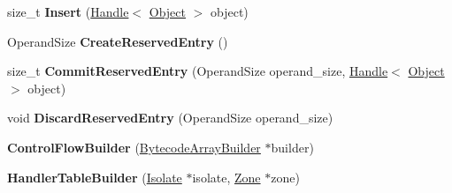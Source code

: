 \begin{DoxyCompactItemize}
\item 
size\+\_\+t {\bfseries Insert} (\hyperlink{classv8_1_1internal_1_1_handle}{Handle}$<$ \hyperlink{classv8_1_1internal_1_1_object}{Object} $>$ object)\hypertarget{classv8_1_1internal_1_1interpreter_1_1_b_a_s_e___e_m_b_e_d_d_e_d_a3e75c4dd219a2caca47c3ab4bd1121ea}{}\label{classv8_1_1internal_1_1interpreter_1_1_b_a_s_e___e_m_b_e_d_d_e_d_a3e75c4dd219a2caca47c3ab4bd1121ea}

\item 
Operand\+Size {\bfseries Create\+Reserved\+Entry} ()\hypertarget{classv8_1_1internal_1_1interpreter_1_1_b_a_s_e___e_m_b_e_d_d_e_d_a2ae73b8d4403040e1e99575c9af0f0ff}{}\label{classv8_1_1internal_1_1interpreter_1_1_b_a_s_e___e_m_b_e_d_d_e_d_a2ae73b8d4403040e1e99575c9af0f0ff}

\item 
size\+\_\+t {\bfseries Commit\+Reserved\+Entry} (Operand\+Size operand\+\_\+size, \hyperlink{classv8_1_1internal_1_1_handle}{Handle}$<$ \hyperlink{classv8_1_1internal_1_1_object}{Object} $>$ object)\hypertarget{classv8_1_1internal_1_1interpreter_1_1_b_a_s_e___e_m_b_e_d_d_e_d_a1522269ce42683f51d47efe988dfccda}{}\label{classv8_1_1internal_1_1interpreter_1_1_b_a_s_e___e_m_b_e_d_d_e_d_a1522269ce42683f51d47efe988dfccda}

\item 
void {\bfseries Discard\+Reserved\+Entry} (Operand\+Size operand\+\_\+size)\hypertarget{classv8_1_1internal_1_1interpreter_1_1_b_a_s_e___e_m_b_e_d_d_e_d_a1d2eaa28859ff3b8e3631918af680a5c}{}\label{classv8_1_1internal_1_1interpreter_1_1_b_a_s_e___e_m_b_e_d_d_e_d_a1d2eaa28859ff3b8e3631918af680a5c}

\item 
{\bfseries Control\+Flow\+Builder} (\hyperlink{classv8_1_1internal_1_1interpreter_1_1_bytecode_array_builder}{Bytecode\+Array\+Builder} $\ast$builder)\hypertarget{classv8_1_1internal_1_1interpreter_1_1_b_a_s_e___e_m_b_e_d_d_e_d_a3954ff966bf9e6f3c05012eadbdc7071}{}\label{classv8_1_1internal_1_1interpreter_1_1_b_a_s_e___e_m_b_e_d_d_e_d_a3954ff966bf9e6f3c05012eadbdc7071}

\item 
{\bfseries Handler\+Table\+Builder} (\hyperlink{classv8_1_1internal_1_1_isolate}{Isolate} $\ast$isolate, \hyperlink{classv8_1_1internal_1_1_zone}{Zone} $\ast$zone)\hypertarget{classv8_1_1internal_1_1interpreter_1_1_b_a_s_e___e_m_b_e_d_d_e_d_ad95fc44f4933ab08ddd1c5e91913da2c}{}\label{classv8_1_1internal_1_1interpreter_1_1_b_a_s_e___e_m_b_e_d_d_e_d_ad95fc44f4933ab08ddd1c5e91913da2c}


\end{DoxyCompactItemize}
